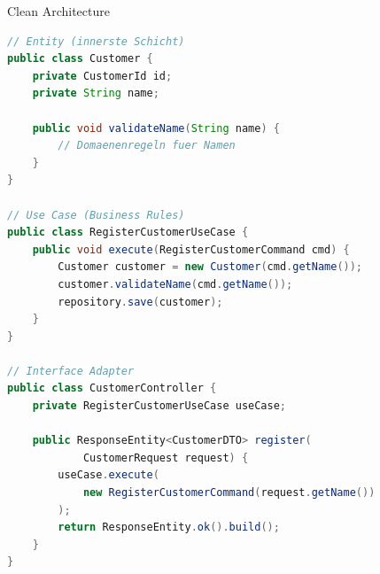 \begin{concept}{Clean Architecture}
\begin{lstlisting}[language=Java, style=basesmol]
// Entity (innerste Schicht)
public class Customer {
    private CustomerId id;
    private String name;
    
    public void validateName(String name) {
        // Domaenenregeln fuer Namen
    }
}

// Use Case (Business Rules)
public class RegisterCustomerUseCase {
    public void execute(RegisterCustomerCommand cmd) {
        Customer customer = new Customer(cmd.getName());
        customer.validateName(cmd.getName());
        repository.save(customer);
    }
}

// Interface Adapter
public class CustomerController {
    private RegisterCustomerUseCase useCase;
    
    public ResponseEntity<CustomerDTO> register(
            CustomerRequest request) {
        useCase.execute(
            new RegisterCustomerCommand(request.getName())
        );
        return ResponseEntity.ok().build();
    }
}
\end{lstlisting}
\end{concept}

